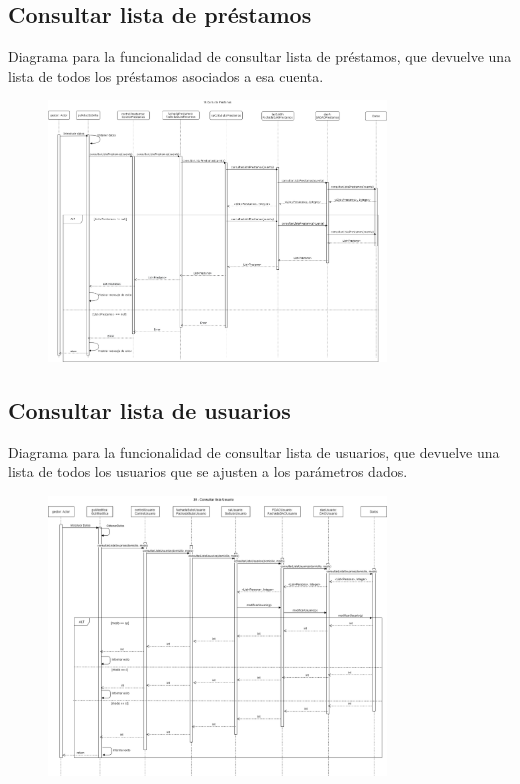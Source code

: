 \documentclass[12pt]{article}
\begin{document}
\subsection{Consultar lista de préstamos}
Diagrama para la funcionalidad de consultar lista de préstamos, que devuelve una lista de todos los préstamos asociados a esa cuenta.
\begin{figure}[H]
    \centering
    \includegraphics[width=0.8\textwidth]{images/19_consultar_prestamos.png}
\end{figure}
\subsection{Consultar lista de usuarios}
Diagrama para la funcionalidad de consultar lista de usuarios, que devuelve una lista de todos los usuarios que se ajusten a los parámetros dados.
\begin{figure}[H]
    \centering
    \includegraphics[width=0.8\textwidth]{images/20-consultarlistausuarios.png}
\end{figure}
\end{document}
